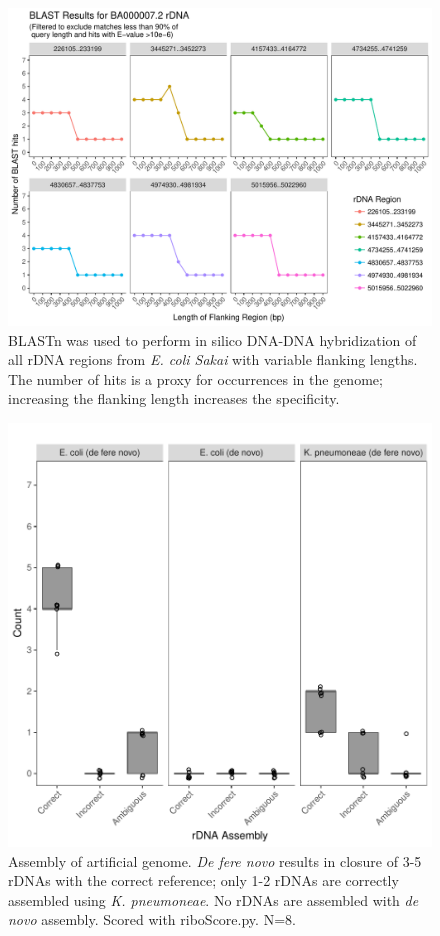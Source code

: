 \documentclass[10pt]{article}
\begin{document}
\begin{figure}[!h]
    \centering
    \hspace*{0cm}\includegraphics[width=.99\textwidth]{sakai_BLAST_results}
    \caption{BLASTn was used to perform in silico DNA-DNA hybridization of all rDNA regions from \textit{E. coli Sakai} with variable flanking lengths. The number of hits is a proxy for occurrences in the genome; increasing the flanking length increases the specificity.}
    \label{fig:blast}
\end{figure}
\begin{figure}[!h]
    \centering
    \hspace*{0cm}\includegraphics[width=.40\textwidth, page=3]{simulated_genome}
    \caption{Assembly of artificial genome. \textit{De fere novo} results in closure of 3-5 rDNAs with the correct reference; only 1-2 rDNAs are correctly assembled using \textit{K. pneumoneae}.  No rDNAs are assembled with \textit{de novo} assembly. Scored with riboScore.py. N=8.}
    \label{fig:simgenome}
\end{figure}
\end{document}

